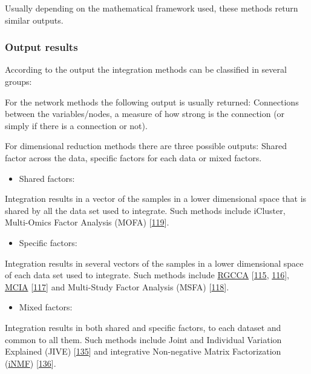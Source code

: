 \documentclass[
  12pt,
  a4paper,
  twoside,
  openright]{book}
\providecommand{\tightlist}{%
  \setlength{\itemsep}{0pt}\setlength{\parskip}{0pt}}
\begin{document}
Usually depending on the mathematical framework used, these methods return similar outputs.

\hypertarget{output-results}{%
\subsubsection{Output results}\label{output-results}}

According to the output the integration methods can be classified in several groups:

For the network methods the following output is usually returned: Connections between the variables/nodes, a measure of how strong is the connection (or simply if there is a connection or not).

For dimensional reduction methods there are three possible outputs: Shared factor across the data, specific factors for each data or mixed factors.

\begin{itemize}
\tightlist
\item
  Shared factors:
\end{itemize}

Integration results in a vector of the samples in a lower dimensional space that is shared by all the data set used to integrate.
Such methods include iCluster, Multi-Omics Factor Analysis (MOFA) {[}\protect\hyperlink{ref-argelaguet_multi-omics_2018}{119}{]}.

\begin{itemize}
\tightlist
\item
  Specific factors:
\end{itemize}

Integration results in several vectors of the samples in a lower dimensional space of each data set used to integrate.
Such methods include \protect\hyperlink{acronyms_RGCCA}{RGCCA} {[}\protect\hyperlink{ref-tenenhaus_regularized_2011}{115}, \protect\hyperlink{ref-tenenhaus_variable_2014}{116}{]}, \protect\hyperlink{acronyms_MCIA}{MCIA} {[}\protect\hyperlink{ref-culhane_cross-platform_2003}{117}{]} and Multi-Study Factor Analysis (MSFA) {[}\protect\hyperlink{ref-vito_multi-study_2019}{118}{]}.

\begin{itemize}
\tightlist
\item
  Mixed factors:
\end{itemize}

Integration results in both shared and specific factors, to each dataset and common to all them.
Such methods include Joint and Individual Variation Explained (JIVE) {[}\protect\hyperlink{ref-lock2013a}{135}{]} and integrative Non-negative Matrix Factorization (\href{https://github.com/yangzi4/iNMF}{iNMF}) {[}\protect\hyperlink{ref-yang2016}{136}{]}.
\end{document}
